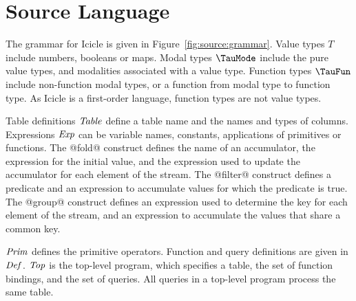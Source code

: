 \section{Source Language}
\label{s:IcicleSource}





The grammar for Icicle is given in Figure~\ref{fig:source:grammar}. Value types $T$ include numbers, booleans or maps. Modal types $\TauMode$ include the pure value types, and modalities associated with a value type. Function types $\TauFun$ include non-function modal types, or a function from modal type to function type. As Icicle is a first-order language, function types are not value types.

Table definitions $\mathit{Table}$ define a table name and the names and types of columns. Expressions $\mathit{Exp}$ can be variable names, constants, applications of primitives or functions. The @fold@ construct defines the name of an accumulator, the expression for the initial value, and the expression used to update the accumulator for each element of the stream. The @filter@ construct defines a predicate and an expression to accumulate values for which the predicate is true. The @group@ construct defines an expression used to determine the key for each element of the stream, and an expression to accumulate the values that share a common key.

$\mathit{Prim}$ defines the primitive operators.
Function and query definitions are given in $\mathit{Def}$. $\mathit{Top}$ is the top-level program, which specifies a table, the set of function bindings, and the set of queries. All queries in a top-level program process the same table.





